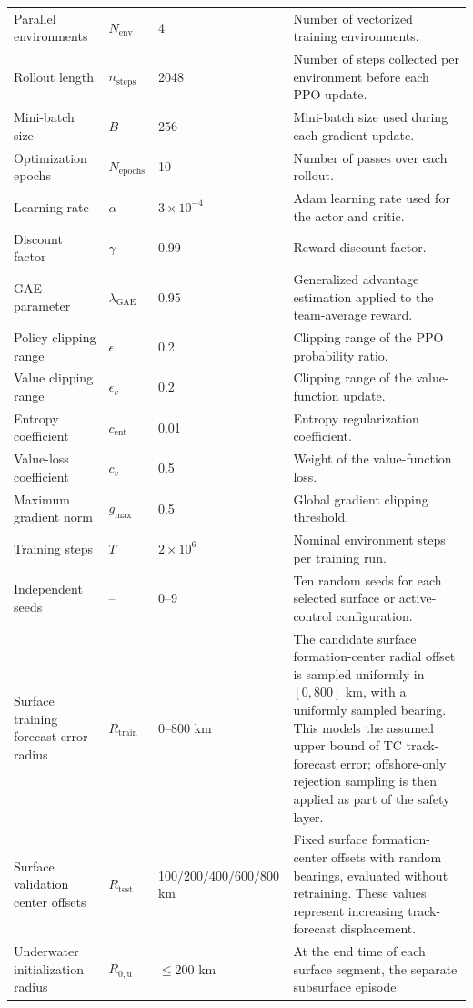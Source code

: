\documentclass[a4paper,fleqn]{cas-dc}
\begin{document}
\begin{minipage}{\textwidth}
{\begin{tabular}{@{}p{}p{}p{}p{}@{}}
Parallel environments & $N_{\mathrm{env}}$ & 4 &
Number of vectorized training environments. \\
Rollout length & $n_{\mathrm{steps}}$ & 2048 &
Number of steps collected per environment before each PPO update. \\
Mini-batch size & $B$ & 256 &
Mini-batch size used during each gradient update. \\
Optimization epochs & $N_{\mathrm{epochs}}$ & 10 &
Number of passes over each rollout. \\
Learning rate & $\alpha$ & $3\times10^{-4}$ &
Adam learning rate used for the actor and critic. \\
Discount factor & $\gamma$ & 0.99 &
Reward discount factor. \\
GAE parameter & $\lambda_{\mathrm{GAE}}$ & 0.95 &
Generalized advantage estimation applied to the team-average reward. \\
Policy clipping range & $\epsilon$ & 0.2 &
Clipping range of the PPO probability ratio. \\
Value clipping range & $\epsilon_v$ & 0.2 &
Clipping range of the value-function update. \\
Entropy coefficient & $c_{\mathrm{ent}}$ & 0.01 &
Entropy regularization coefficient. \\
Value-loss coefficient & $c_v$ & 0.5 &
Weight of the value-function loss. \\
Maximum gradient norm & $g_{\max}$ & 0.5 &
Global gradient clipping threshold. \\
Training steps & $T$ & $2\times10^6$ &
Nominal environment steps per training run. \\
Independent seeds & -- & 0--9 &
Ten random seeds for each selected surface or active-control configuration. \\
Surface training forecast-error radius & $R_{\mathrm{train}}$ & 0--800 km &
The candidate surface formation-center radial offset is sampled uniformly in
\([0,800]\) km, with a uniformly sampled bearing. This models the assumed
upper bound of TC track-forecast error; offshore-only rejection sampling is
then applied as part of the safety layer. \\
Surface validation center offsets & $R_{\mathrm{test}}$ &
100/200/400/600/800 km &
Fixed surface formation-center offsets with random bearings, evaluated without
retraining. These values represent increasing track-forecast displacement. \\
Underwater initialization radius & $R_{0,\mathrm{u}}$ & $\leq$200 km &
At the end time of each surface segment, the separate subsurface episode

\end{tabular}}
\end{minipage}
\end{document}
